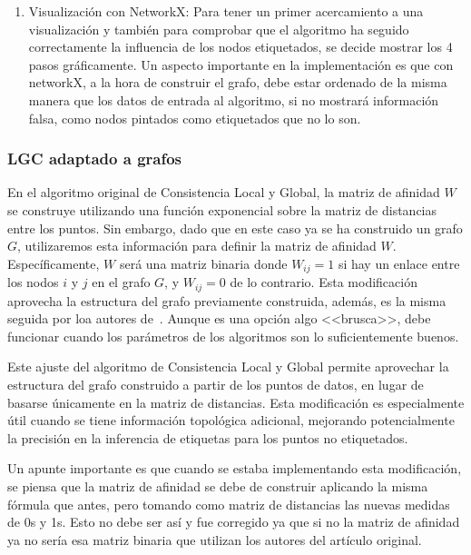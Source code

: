 \begin{enumerate}
	\item Visualización con NetworkX: Para tener un primer acercamiento a una visualización y también para comprobar que el algoritmo ha seguido correctamente la influencia de los nodos etiquetados, se decide mostrar los 4 pasos gráficamente. Un aspecto importante en la implementación es que con networkX, a la hora de construir el grafo, debe estar ordenado de la misma manera que los datos de entrada al algoritmo, si no mostrará información falsa, como nodos pintados como etiquetados que no lo son.
\end{enumerate}
\subsubsection{LGC adaptado a grafos}\label{sec5:LGC}
En el algoritmo original de Consistencia Local y Global, la matriz de afinidad $W$ se construye utilizando una función exponencial sobre la matriz de distancias entre los puntos. Sin embargo, dado que en este caso ya se ha construido un grafo $G$, utilizaremos esta información para definir la matriz de afinidad $W$. Específicamente, $W$ será una matriz binaria donde $W_{ij}=1$ si hay un enlace entre los nodos $i$ y $j$ en el grafo $G$, y $W_{ij}=0$ de lo contrario. Esta modificación aprovecha la estructura del grafo previamente construida, además, es la misma seguida por loa autores de~\cite{gbili}. Aunque es una opción algo <<brusca>>, debe funcionar cuando los parámetros de los algoritmos son lo suficientemente buenos.

Este ajuste del algoritmo de Consistencia Local y Global permite aprovechar la estructura del grafo construido a partir de los puntos de datos, en lugar de basarse únicamente en la matriz de distancias. Esta modificación es especialmente útil cuando se tiene información topológica adicional, mejorando potencialmente la precisión en la inferencia de etiquetas para los puntos no etiquetados.

Un apunte importante es que cuando se estaba implementando esta modificación, se piensa que la matriz de afinidad se debe de construir aplicando la misma fórmula que antes, pero tomando como matriz de distancias las nuevas medidas de 0s y 1s. Esto no debe ser así y fue corregido ya que si no la matriz de afinidad ya no sería esa matriz binaria que utilizan los autores del artículo original.
